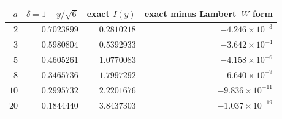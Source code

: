 \begin{tabular}{@{}rrrr@{}}
\toprule
$a$ & $\delta=1-y/\sqrt6$ & exact $I(y)$ & exact minus Lambert--$W$ form\\
\midrule
$2$ & $0.7023899$ & $0.2810218$ & $-4.246\times 10^{-3}$\\
$3$ & $0.5980804$ & $0.5392933$ & $-3.642\times 10^{-4}$\\
$5$ & $0.4605261$ & $1.0770083$ & $-4.158\times 10^{-6}$\\
$8$ & $0.3465736$ & $1.7997292$ & $-6.640\times 10^{-9}$\\
$10$ & $0.2995732$ & $2.2201676$ & $-9.836\times 10^{-11}$\\
$20$ & $0.1844440$ & $3.8437303$ & $-1.037\times 10^{-19}$\\
\bottomrule
\end{tabular}
